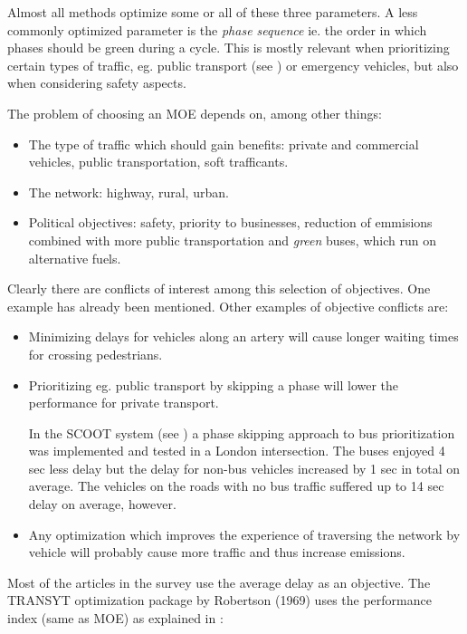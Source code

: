 Almost all methods optimize some or all of these three parameters. A
less commonly optimized parameter is the \textit{phase sequence}
ie. the order in which phases should be green during a cycle. This is
mostly relevant when prioritizing certain types of traffic, eg. public
transport (see \cite{scoot2004}) or emergency vehicles, but also when
considering safety aspects.

The problem of choosing an MOE depends on, among other things:

\begin{itemize}
\item The type of traffic which should gain benefits: private and commercial vehicles, public transportation, soft trafficants.
\item The network: highway, rural, urban.
\item Political objectives: safety, priority to businesses, reduction of emmisions combined with more public transportation and \textit{green} buses, which run on alternative fuels.
\end{itemize}

Clearly there are conflicts of interest among this selection of
objectives. One example has already been mentioned. Other examples of
objective conflicts are:

\begin{itemize}
\item Minimizing delays for vehicles along an artery will cause longer waiting times for crossing pedestrians.
\item Prioritizing eg. public transport by skipping a phase will lower the performance for private transport. 

In the SCOOT system (see \cite{scoot2004}) a phase skipping approach
to bus prioritization was implemented and tested in a London
intersection. The buses enjoyed 4 sec less delay but the delay for
non-bus vehicles increased by 1 sec in total on average. The vehicles
on the roads with no bus traffic suffered up to 14 sec delay on
average, however.

\item Any optimization which improves the experience of traversing the network by vehicle will probably cause more traffic and thus increase emissions.

\end{itemize}

Most of the articles in the survey use the average delay as an
objective. The TRANSYT optimization package by Robertson (1969) uses
the performance index (same as MOE) as explained in \cite{26}:

